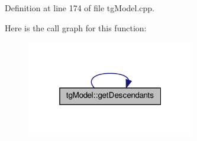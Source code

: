 Definition at line 174 of file tg\-Model.\-cpp.



Here is the call graph for this function\-:\nopagebreak
\begin{figure}[H]
\begin{center}
\leavevmode
\includegraphics[width=208pt]{classtg_model_a2efa4321fa5c77b4ce23b01f6fd3a1c4_cgraph}
\end{center}
\end{figure}



